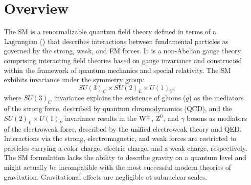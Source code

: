 \section{Overview}
\label{sec:sm_overview}

The SM is a renormalizable quantum field theory defined in terms of a Lagrangian (\lagrang) that describes interactions between fundamental particles as governed by the strong, weak, and EM forces.
It is a non-Abelian gauge theory comprising interacting field theories based on gauge invariance and constructed within the framework of quantum mechanics and special relativity.
The SM exhibits invariance under the symmetry group:
\begin{equation*}
    SU(3)_C \times SU(2)_L \times U(1)_Y,
\end{equation*}
where $SU(3)_C$ invariance explains the existence of gluons ($g$) as the mediators of the strong force, described by quantum chromodynamics (QCD), and the $SU(2)_L \times U(1)_Y$ invariance results in the $\mathrm{W}^\pm$, $\text{Z}^0$, and $\gamma$ bosons as mediators of the electroweak force, described by the unified electroweak theory and QED.
Interactions via the strong, electromagnetic, and weak forces are restricted to particles carrying a color charge, electric charge, and a weak charge, respectively.
The SM formulation lacks the ability to describe gravity on a quantum level and might actually be incompatible with the most successful modern theories of gravitation.
Gravitational effects are negligible at subnuclear scales.



